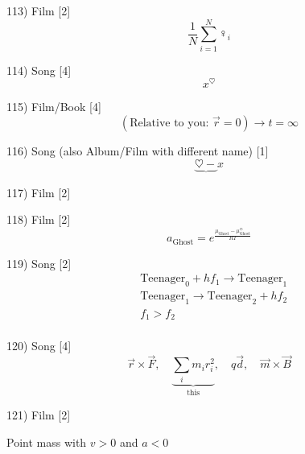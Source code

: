 \documentclass[10pt]{article}
\begin{document}
    113) Film [2]
    \[
        \frac{1}{N} \sum_{i=1}^{N}\female_i
\]

    114) Song [4]
    \[
      x^\heartsuit
    \]

    115) Film/Book [4]
    \[
      (\text{Relative to you: } \vec{r}=0 ) \to t = \infty
    \]

    116) Song (also Album/Film with different name) [1]
    \[
        \underbrace{\heartsuit -} x   
    \]

    117) Film [2]
    \begin{figure}[htbp!]
    \end{figure}

    118) Film [2]
    \[
      a_\text{Ghost} = e^{\frac{\mu_\text{Ghost} - \mu_\text{Ghost}^\ominus}{RT}}
    \]

    119) Song [2]
    \[
    \begin{split}
      &\text{Teenager}_0 + h f_1 \to \text{Teenager}_1 \\
      &\text{Teenager}_1 \to \text{Teenager}_2 + h f_2 \\
      &f_1 > f_2 \\
    \end{split}
    \]

    120) Song [4]
    \[
      \vec{r} \times \vec{F}, \quad \underbrace{\sum_i m_i r_i^2}_{\text{this}}, \quad  q \vec{d}, \quad  \vec{m} \times \vec{B} 
    \]

    121) Film [2]
    
      Point mass with $v>0$ and $a<0$
    
\end{document}
